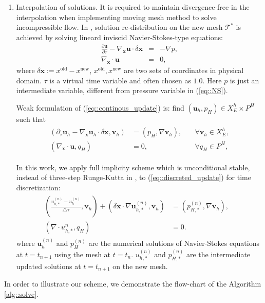 \documentclass[mathpazo]{aamm}
\begin{document}
\begin{enumerate}[step 1]
   \item Interpolation of solutions. It is required to maintain divergence-free in the interpolation
     when implementing moving mesh method to solve incompressible
     flow. In \cite{di2005moving}, solution re-distribution on the new 
     mesh $\mathcal{T}^*$ is achieved by solving lineard inviscid 
     Navier-Stokes-type equations:
     \begin{eqnarray}
       \frac{\partial \mathbf{u}}{\partial \tau} - \nabla_{\mathbf{x}}\mathbf{u}
       \cdot \delta \mathbf{x} & = & - \nabla p, \\
       \nabla_{\mathbf{x}}\cdot \mathbf{u} & = & 0,
       \label{eq::continous_update}
     \end{eqnarray} 
     where $\delta \mathbf{x} := x^{\text{old}} - x^{\text{new}}$,
     $x^{\text{old}}, x^{\text{new}}$ are two sets of coordinates in
     physical domain. $\tau$ is a virtual time variable and often
     chosen as $1.0$. Here $p$ is just an intermediate variable,
     different from pressure variable in (\ref{eq::NS}). 

     Weak formulation of (\ref{eq::continous_update}) is: find $(\mathbf{u}_h,
     p_H) \in X_E^h \times P^H$ such that 
     \begin{eqnarray}
       \begin{aligned}
         \left( \partial_{\tau} \mathbf{u}_h - \nabla_{\mathbf{x}}\mathbf{u}_h
           \cdot \delta \mathbf{x}, \mathbf{v}_h \right) & = \left( p_H, \nabla
           \mathbf{v}_h \right), &\quad \forall \mathbf{v}_h \in X_E^h, \\
         \left( \nabla_{\mathbf{x}} \cdot \mathbf{u}, q_H\right) & = 0,& \quad \forall
         q_H \in P^H,
       \end{aligned}
       \label{eq::discreted_update}
     \end{eqnarray}
     
     In this work, we apply full implicity scheme which is
     unconditional stable, instead of
     three-step Runge-Kutta in \cite{di2005moving}, to
     (\ref{eq::discreted_update}) for time discretization:
     \begin{eqnarray}
       \begin{aligned}
         \left ( \frac{u_{h, *}^{(n)} - u_h^{(n)}}{\triangle \tau},
           \mathbf{v}_h \right) + \left( \delta \mathbf{x} \cdot \nabla 
           \mathbf{u}_{h, *}^{(n)}, \mathbf{v}_h \right)  & = \left( 
           p_{H, *}^{(n)}, \nabla \mathbf{v}_h \right), &\\
         \left( \nabla \cdot u_{h, *}^{n}, q_H \right) & = 0.&
       \end{aligned}
     \end{eqnarray}
     where $\mathbf{u}_h^{(n)}$ and $p_H^{(n)}$ are the numerical solutions of
     Navier-Stokes equations at $t = t_{n + 1}$ using the mesh at $t
     = t_n$. $u_{h,*}^{(n)}$ and $p_{H, *}^{(n)}$ are the intermediate
     updated solutions at $t =t_{n + 1}$ on the new mesh. 
   \end{enumerate}
   In order to illustrate our scheme, we demonstrate the flow-chart of the Algorithm
   \ref{alg::solve}.
\end{document}
